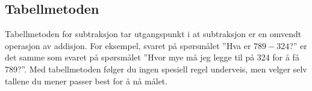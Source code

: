 \subsection{Tabellmetoden}
Tabellmetoden for subtraksjon tar utgangspunkt i at subtraksjon er en omvendt operasjon av addisjon. For eksempel, svaret på spørsmålet ''Hva er $ 789-324 $?'' er det samme som svaret på spørsmålet ''Hvor mye må jeg legge til på 324 for å få 789?''. Med tabellmetoden følger du ingen spesiell regel underveis, men velger selv tallene du mener passer best for å nå målet.\\
\begin{center}
\parbox{0.35\linewidth}{
} \qquad
\parbox{0.35\linewidth}{
	} \\[12pt]
\parbox{0.35\linewidth}{
	} \qquad 
\parbox{0.4\linewidth}{
	}
\end{center}
